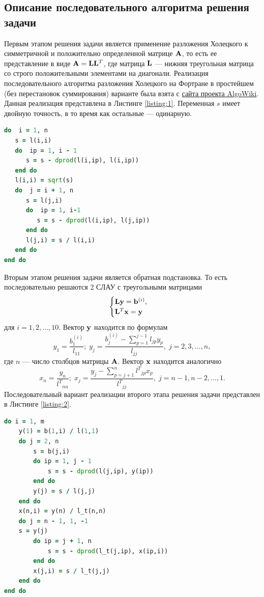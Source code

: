 \documentclass[12pt]{article}
\begin{document}
\subsection{Описание последовательного алгоритма решения задачи}

Первым этапом решения задачи является применение разложения Холецкого к симметричной и положительно определенной матрице $\vb{A}$, то есть ее представление в виде $\vb{A}=\vb{L}\vb{L}^T$, где матрица $\vb{L}$ --- нижняя треугольная матрица со строго положительными элементами на диагонали. Реализация последовательного алгоритма разложения Холецкого на Фортране в простейшем (без перестановок суммирования) варианте была взята с \href{https://algowiki-project.org/en/Cholesky_decomposition}{сайта проекта AlgoWiki}. Данная реализация представлена в Листинге \ref{listing:1}. Переменная $s$ имеет двойную точность, в то время как остальные --- одинарную.
\begin{lstlisting}[language=fortran, style=fortran, label={listing:1}, caption=Реализация последовательного алгоритма разложения Холецкого на Фортране в простейшем (без перестановок суммирования) варианте.]
do  i = 1, n
   s = l(i,i)
   do  ip = 1, i - 1
      s = s - dprod(l(i,ip), l(i,ip))
   end do
   l(i,i) = sqrt(s)
   do  j = i + 1, n
      s = l(j,i)
      do  ip = 1, i-1
         s = s - dprod(l(i,ip), l(j,ip))
      end do
      l(j,i) = s / l(i,i)
   end do
end do
\end{lstlisting}

Вторым этапом решения задачи является обратная подстановка. То есть последовательно решаются 2 СЛАУ с треугольными матрицами
$$
\begin{cases}
    \vb{L}\vb{y} = \vb{b}^{(i)},\\
    \vb{L}^T\vb{x} = \vb{y}
\end{cases}
$$
для $i=1,2,\ldots,10$. Вектор $\vb{y}$ находится по формулам
$$
y_1 = \dfrac{b^{(i)}_1}{l_{11}};\; y_{j} = \dfrac{b_j^{(i)} - \sum_{p=1}^{j-1} l_{jp} y_p}{l_{jj}},\; j=2,3,\ldots,n,
$$
где $n$ --- число столбцов матрицы $\vb{A}$. Вектор $\vb{x}$ находится аналогично
$$
x_n = \dfrac{y_n}{{l^T}_{nn}};\; x_{j} = \dfrac{y_j - \sum_{p=j+1}^{n} {l^T}_{jp} x_p}{{l^T}_{jj}},\; j=n-1,n-2,\ldots,1.
$$
Последовательный вариант реализации второго этапа решения задачи представлен в Листинге \ref{listing:2}.
\begin{lstlisting}[language=fortran, style=fortran, label={listing:2}, caption=Последовательная реализация обратной подстановки на Фортране.]
do i = 1, m
    y(1) = b(1,i) / l(1,1)
    do j = 2, n
        s = b(j,i)
        do ip = 1, j - 1
            s = s - dprod(l(j,ip), y(ip))
        end do
        y(j) = s / l(j,j)
    end do
    x(n,i) = y(n) / l_t(n,n)
    do j = n - 1, 1, -1
    s = y(j)
        do ip = j + 1, n
            s = s - dprod(l_t(j,ip), x(ip,i)) 
        end do
        x(j,i) = s / l_t(j,j)
    end do
end do
\end{lstlisting}
\end{document}
